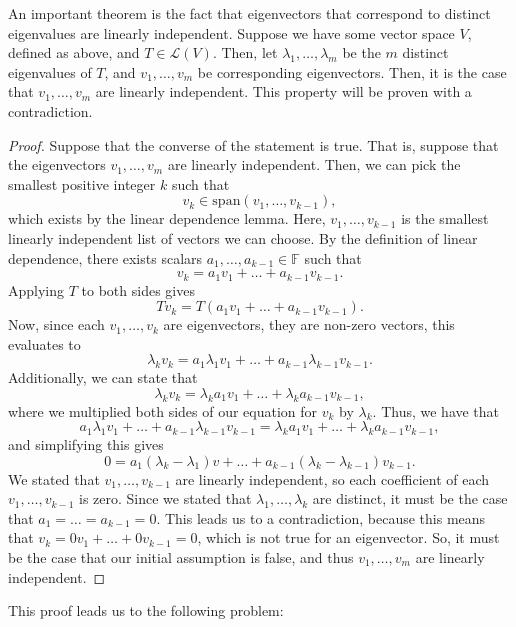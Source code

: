 \documentclass{article}
\renewcommand{\L}{\mathcal{L}}
\newcommand{\spans}{\mathrm{span}}
\newcommand{\F}{\mathbb{F}}
\theoremstyle{definition}
\begin{document}
An important theorem is the fact that eigenvectors that correspond to distinct eigenvalues are linearly independent. Suppose we have some vector space $V$, defined as above, and $T \in \L(V)$. Then, let $\lambda_1, \dots, \lambda_m$ be the $m$ distinct eigenvalues of $T$, and $v_1, \dots, v_m$ be corresponding eigenvectors. Then, it is the case that $v_1, \dots, v_m$ are linearly independent. This property will be proven with a contradiction.
\begin{proof}
    Suppose that the converse of the statement is true. That is, suppose that the eigenvectors $v_1, \dots, v_m$ are linearly independent. Then, we can pick the smallest positive integer $k$ such that $$v_k \in \spans{(v_1, \dots, v_{k - 1})},$$ which exists by the linear dependence lemma. Here, $v_1, \dots, v_{k - 1}$ is the smallest linearly independent list of vectors we can choose. By the definition of linear dependence, there exists scalars $a_1, \dots, a_{k - 1} \in \F$ such that $$v_{k} = a_1v_1 + \dots + a_{k - 1}v_{k - 1}.$$ Applying $T$ to both sides gives $$Tv_{k} = T(a_1v_1 + \dots + a_{k - 1}v_{k - 1}).$$ Now, since each $v_1, \dots, v_k$ are eigenvectors, they are non-zero vectors, this evaluates to $$\lambda_kv_k = a_1\lambda_1v_1 + \dots + a_{k - 1}\lambda_{k - 1}v_{k - 1}.$$ Additionally, we can state that $$\lambda_k v_{k} = \lambda_ka_1v_1 + \dots + \lambda_ka_{k - 1}v_{k - 1},$$ where we multiplied both sides of our equation for $v_k$ by $\lambda_k$. Thus, we have that $$a_1\lambda_1v_1 + \dots + a_{k - 1}\lambda_{k - 1}v_{k - 1} = \lambda_ka_1v_1 + \dots + \lambda_ka_{k - 1}v_{k - 1},$$ and simplifying this gives $$0 = a_1(\lambda_k - \lambda_1)v + \dots + a_{k - 1}(\lambda_k - \lambda_{k - 1})v_{k - 1}.$$ We stated that $v_1, \dots, v_{k - 1}$ are linearly independent, so each coefficient of each $v_1, \dots, v_{k - 1}$ is zero. Since we stated that $\lambda_1, \dots, \lambda_{k}$ are distinct, it must be the case that $a_1 = \dots = a_{k - 1} = 0$. This leads us to a contradiction, because this means that $v_k = 0v_1 + \dots + 0v_{k - 1} = 0$, which is not true for an eigenvector. So, it must be the case that our initial assumption is false, and thus $v_1, \dots, v_m$ are linearly independent.
\end{proof}
This proof leads us to the following problem:
\end{document}
